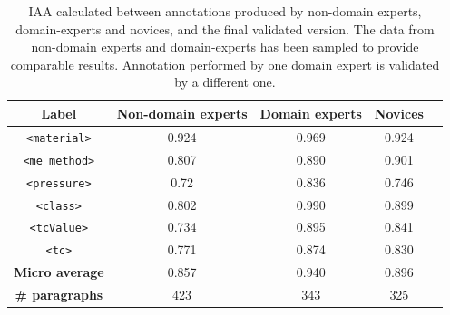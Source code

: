 \documentclass[fleqn,10pt]{wlscirep}
\begin{document}
\begin{table}[h]
    \centering
    \begin{tabular}{ | c | c | c | c | c | } 
    \hline
        \textbf{Label} & \textbf{Non-domain experts} & \textbf{Domain experts} & \textbf{Novices}\\
    \hline
        \texttt{<material>}     &   0.924   &   0.969   &   0.924   \\
        \texttt{<me\_method>}   &	0.807   &	0.890   &   0.901   \\
        \texttt{<pressure>}     &	0.72    &	0.836   &   0.746   \\
        \texttt{<class>}        &	0.802	&   0.990   &   0.899   \\
        \texttt{<tcValue>}      &	0.734	&   0.895   &   0.841   \\
        \texttt{<tc>}           &	0.771	&   0.874   &   0.830   \\
    \hline
        \textbf{Micro average}        &	0.857	&   0.940   &   0.896   \\
    \hline
        \textbf{\# paragraphs}  &	423	    &   343     &   325     \\
    \hline
    \end{tabular}
    \caption{IAA calculated between annotations produced by non-domain experts, domain-experts and novices, and the final validated version. The data from non-domain experts and domain-experts has been sampled to provide comparable results. Annotation performed by one domain expert is validated by a different one. }
    \label{table:comparison-iaa-nde-de}
\end{table}
\end{document}
